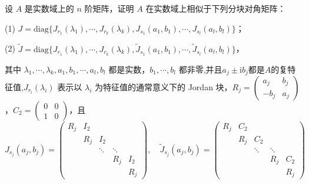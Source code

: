 \documentclass[../../main.tex]{subfiles}
\begin{document}
\begin{proposition}[实数域上的广义Jordan标准型]\label{proposition:广义Jordan标准型}
设 $A$ 是实数域上的 $n$ 阶矩阵，证明 $A$ 在实数域上相似于下列分块对角矩阵：

(1) $J = \mathrm{diag}\{J_{r_1}(\lambda_1),\cdots,J_{r_k}(\lambda_k),J_{s_1}(a_1,b_1),\cdots,J_{s_l}(a_l,b_l)\}$；

(2) $\widetilde{J} = \mathrm{diag}\{J_{r_1}(\lambda_1),\cdots,J_{r_k}(\lambda_k),\widetilde{J}_{s_1}(a_1,b_1),\cdots,\widetilde{J}_{s_l}(a_l,b_l)\}$，

其中 $\lambda_1,\cdots,\lambda_k,a_1,b_1,\cdots,a_l,b_l$ 都是实数，$b_1,\cdots,b_l$ 都非零,并且$a_j\pm \mathrm{i}b_j$都是$A$的复特征值,$J_{r_i}(\lambda_i)$ 表示以 $\lambda_i$ 为特征值的通常意义下的 Jordan 块，$R_j = \begin{pmatrix}a_j & b_j \\ -b_j & a_j\end{pmatrix}$，$C_2 = \begin{pmatrix}0 & 0 \\ 1 & 0\end{pmatrix}$，且
\[
J_{s_j}(a_j,b_j) = 
\begin{pmatrix}
R_j & I_2 & & \\
& R_j & I_2 & \\
& & \ddots & \ddots \\
& & & R_j & I_2 \\
& & & & R_j
\end{pmatrix}, \quad
\widetilde{J}_{s_j}(a_j,b_j) = 
\begin{pmatrix}
R_j & C_2 & & \\
& R_j & C_2 & \\
& & \ddots & \ddots \\
& & & R_j & C_2 \\
& & & & R_j
\end{pmatrix}
\]
\end{proposition}
\end{document}
